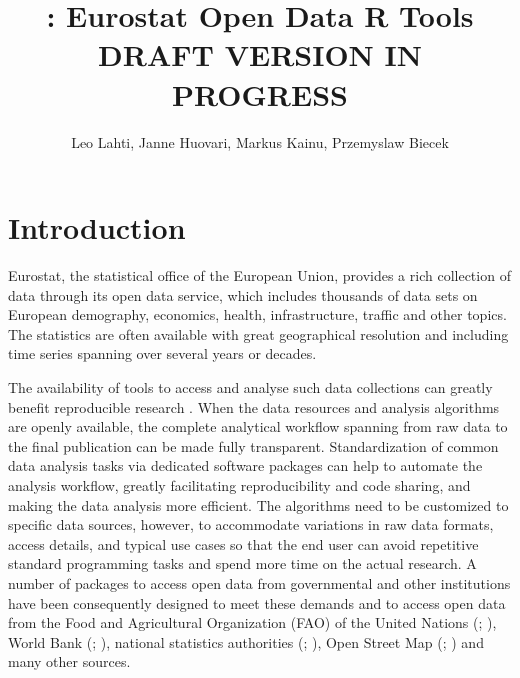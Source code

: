 \title{: Eurostat Open Data R Tools\\DRAFT VERSION IN PROGRESS}
\author{Leo Lahti, Janne Huovari, Markus Kainu, Przemyslaw Biecek}

\maketitle


\section{Introduction}

Eurostat, the statistical office of the European Union, provides a
rich collection of data through its open data
service, which includes thousands of data sets on European demography,
economics, health, infrastructure, traffic and other topics. The
statistics are often available with great geographical resolution and
including time series spanning over several years or decades.

The availability of tools to access and analyse such data collections
can greatly benefit reproducible research \citep{Gandrud13,
Boettiger2015}. When the data resources and analysis algorithms are
openly available, the complete analytical workflow spanning from raw
data to the final publication can be made fully
transparent. Standardization of common data analysis tasks via
dedicated software packages can help to automate the analysis
workflow, greatly facilitating reproducibility and code sharing, and
making the data analysis more efficient. The algorithms need to be
customized to specific data sources, however, to accommodate
variations in raw data formats, access details, and typical use cases
so that the end user can avoid repetitive standard programming tasks
and spend more time on the actual research. A number of packages to
access open data from governmental and other institutions have been
consequently designed to meet these demands and to access open data
from the Food and Agricultural Organization (FAO) of the United
Nations (; \cite{FAOSTAT}), World Bank
(; \cite{WDI}), national statistics authorities
(; \cite{pxweb}), Open Street Map
(; \cite{osmar}) and many other sources.


